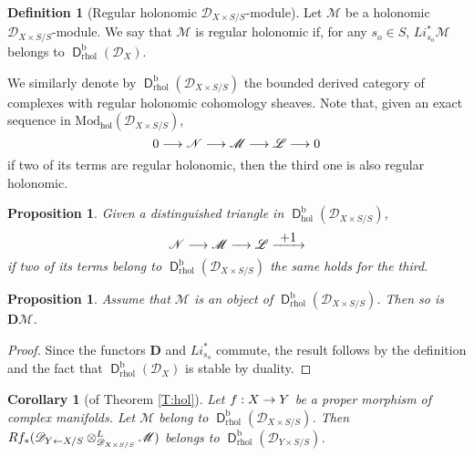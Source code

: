 \documentclass[english]{smfart}
\numberwithin{subsection}{section}
\def\shd{\mathcal{D}}\let\cD\shd
\def\shl{\mathcal{L}}
\def\shm{\mathcal{M}}
\def\shn{\mathcal{N}}\let\shn\shn
\newcommand{\bD}{\boldsymbol{D}}
\newcommand{\rb}{\mathrm{b}}
\newcommand{\hol}{\mathrm{hol}}
\newcommand{\rhol}{\mathrm{rhol}}
\newcommand{\Mod}{\mathrm{Mod}}
\newcommand{\XS}{X\times S}
\newcommand{\DXS}{\shd_{\XS/S}}
\newcommand{\DYS}{\shd_{Y\times S/S}}
\DeclareMathOperator{\Char}{Char}
\DeclareMathOperator{\rD}{\mathsf{D}}
\newcommand{\Di}{{}_{\scriptscriptstyle\mathrm{D}}i}
\numberwithin{equation}{section}
\theoremstyle{plain}
\newtheorem{proposition}[equation]{Proposition}
\newtheorem{corollary}[equation]{Corollary}
\theoremstyle{definition}
\newtheorem{definition}[equation]{Definition}
\def\to{\mathchoice{\longrightarrow}{\rightarrow}{\rightarrow}{\rightarrow}}
\def\from{\mathchoice{\longleftarrow}{\leftarrow}{\leftarrow}{\leftarrow}}
\def\To#1{\mathchoice{\xrightarrow{\textstyle\kern4pt#1\kern3pt}}{\stackrel{#1}{\longrightarrow}}{}{}}
\begin{document}
\begin{definition}[Regular holonomic $\DXS$-module]\label{D:HR}
Let $\shm$ be a holonomic $\DXS$-module. We say that $\shm$ is regular holonomic if, for any $s_o\in S$, $Li^*_{s_o}\shm$ belongs to $\rD^\rb_{\rhol}(\shd_X)$.
\end{definition}

We similarly denote by $\rD^\rb_\rhol(\DXS)$ the bounded derived category of complexes with regular holonomic cohomology sheaves. Note that, given an exact sequence in $\Mod_\hol(\DXS)$,
$$0 \to \shn \to\shm\to\shl \to 0$$ if two of its terms are regular holonomic, then the third one is also regular holonomic.

\begin{proposition}\label{Rhol}
Given a distinguished triangle in $\rD^\rb_{\hol}(\DXS)$,
$$\shn \to\shm\to\shl\To {+1}$$ if two of its terms belong to $\rD^\rb_\rhol(\DXS)$ the same holds for the third.
\end{proposition}

\begin{proposition}\label{P:15}
Assume that $\shm$ is an object of $\rD^\rb_{\rhol}(\DXS)$. Then so is $\bD\shm$.
\end{proposition}

\begin{proof}
Since the functors $\bD$ and $Li^*_{s_o}$ commute, the result follows by the definition and the fact that $\rD^\rb_{\rhol}(\shd_X)$ is stable by duality.
\end{proof}

\begin{comment}
\begin{proposition}\label {Nonchar2}
Let $\shm\in\rD^\rb_{\rhol}(\DXS)$ and let $Y$ be a closed submanifold of $X$. Let~$i_Y$ denote the embedding $Y\times S\to \XS$. Let us assume that $\Char(\shm)\cap T^*_Y\XS\subset T^*_X\XS$. Then $\Di^*_{Y\times S}\shm$ has regular holonomic cohomologies over $\DYS$.
\end{proposition}

\begin{proof}
Apply Proposition \ref{Nonchar} and the commutativity of $Li^*_{s_o}$ with $ f^*$ and $\otimes$, for any $s_o\in S$.
\end{proof}
\end{comment}

\begin{corollary}[of Theorem \ref{T:hol}]\label{T:rholim}
Let $f:X\to Y$ be a proper morphism of complex manifolds.
Let $\shm$ belong to $\rD^\rb_\rhol(\DXS)$. Then $Rf_*(\shd_{Y\from X/S}\otimes^L_{\DXS}\shm)$ belongs to $\rD^\rb_\rhol(\DYS)$.
\end{corollary}
\end{document}
